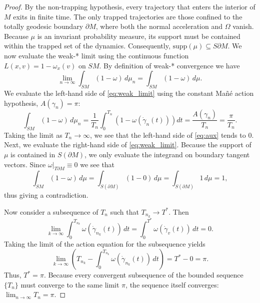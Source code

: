 \documentclass[12pt]{amsart}
\numberwithin{equation}{section}
\begin{document}
\begin{proof}
By the non-trapping hypothesis, every trajectory that enters the interior of $M$ exits in finite time. The only trapped trajectories are those confined to the totally geodesic boundary $\partial M$, where both the normal acceleration and $\Omega$ vanish. Because $\mu$ is an invariant probability measure, its support must be contained within the trapped set of the dynamics. Consequently, $\text{supp}(\mu) \subseteq S\partial M$.
We now evaluate the weak-* limit using the continuous function $L(x,v) = 1 - \omega_{x}(v)$ on $SM$. By definition of weak-* convergence we have
\begin{equation} \label{eq:weak_limit}
    \lim_{n \to \infty} \int_{SM} (1 - \omega) \, d\mu_n = \int_{SM} (1 - \omega) \, d\mu.
\end{equation}
We evaluate the left-hand side of \eqref{eq:weak_limit} using the constant Ma\~n\'e action hypothesis, $A(\gamma_n) = \pi$:
\begin{equation}\label{eq:aux}
    \int_{SM} (1 - \omega) \, d\mu_n = \frac{1}{T_n} \int_0^{T_n} \left( 1 - \omega(\dot{\gamma}_n(t)) \right) dt = \frac{A(\gamma_n)}{T_n} = \frac{\pi}{T_n} .
\end{equation}
Taking the limit as $T_n \to \infty$, we see that the left-hand side of \eqref{eq:aux} tends to $0$.
Next, we evaluate the right-hand side of \eqref{eq:weak_limit}. Because the support of $\mu$ is contained in $S(\partial M)$, we only evaluate the integrand on boundary tangent vectors. Since $\omega|_{T\partial M} \equiv 0$ we see that
\begin{equation}
    \int_{SM} (1 - \omega) \, d\mu = \int_{S(\partial M)} (1 - 0) \, d\mu = \int_{S(\partial M)} 1 \, d\mu = 1 ,
\end{equation}
thus giving a contradiction.

Now consider a subsequence of $T_{n}$ such that $T_{n_k} \to T^*$. Then
\begin{equation}
    \lim_{k \to \infty} \int_0^{T_{n_k}} \omega(\dot{\gamma}_{n_k}(t)) \, dt = \int_0^{T^*} \omega(\dot{\gamma}_v(t)) \, dt=0.
\end{equation}
Taking the limit of the action equation for the subsequence yields
\begin{equation}
    \lim_{k \to \infty} \left( T_{n_k} - \int_0^{T_{n_k}} \omega(\dot{\gamma}_{n_k}(t)) \, dt \right) = T^* - 0 = \pi .
\end{equation}
Thus, $T^* = \pi$. Because every convergent subsequence of the bounded sequence $\{T_n\}$ must converge to the same limit $\pi$, the sequence itself converges: $\lim_{n \to \infty} T_n = \pi$.


\end{proof}
\end{document}
